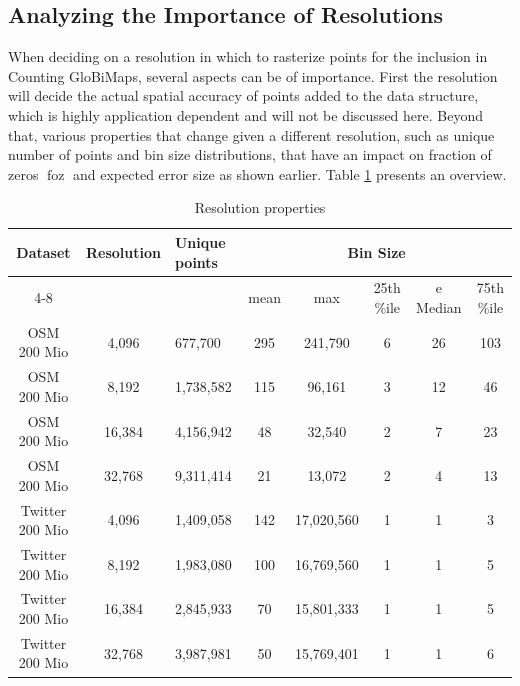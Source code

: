 \documentclass[sigconf, nonacm]{acmart}
\DeclareMathOperator{\foz}{foz}
\begin{document}
\subsection{Analyzing the Importance of Resolutions}
When deciding on a resolution in which to rasterize points for the inclusion in Counting GloBiMaps, several aspects can be of importance. First the resolution will decide the actual spatial accuracy of points added to the data structure, which is highly application dependent and will not be discussed here. Beyond that, various properties that change given a different resolution, such as unique number of points and bin size distributions, that have an impact on fraction of zeros $\foz$ and expected error size as shown earlier. Table \ref{table:Resolutions} presents an overview.

\begin{table}[b!]
  \centering
  \begin{tabular}{|c|c|l|c|c|c|c|c|}
    \hline
    \multirow{2}{*}{\bfseries Dataset}       &
    \multirow{2}{*}{\bfseries Resolution}    &
    \multirow{2}{*}{\bfseries Unique points} &
    \multicolumn{5}{|c|}{\bfseries Bin Size}                                                                               \\
    \cline{4-8}                              &        &           & mean & max        & 25th \%ile & e Median & 75th \%ile \\
    \hline
    OSM 200 Mio                              & 4,096  & 677,700   & 295  & 241,790    & 6          & 26       & 103        \\
    \hline
    OSM 200 Mio                              & 8,192  & 1,738,582 & 115  & 96,161     & 3          & 12       & 46         \\
    \hline
    OSM 200 Mio                              & 16,384 & 4,156,942 & 48   & 32,540     & 2          & 7        & 23         \\
    \hline
    OSM 200 Mio                              & 32,768 & 9,311,414 & 21   & 13,072     & 2          & 4        & 13         \\
    \hline
    Twitter 200 Mio                          & 4,096  & 1,409,058 & 142  & 17,020,560 & 1          & 1        & 3          \\
    \hline
    Twitter 200 Mio                          & 8,192  & 1,983,080 & 100  & 16,769,560 & 1          & 1        & 5          \\
    \hline
    Twitter 200 Mio                          & 16,384 & 2,845,933 & 70   & 15,801,333 & 1          & 1        & 5          \\
    \hline
    Twitter 200 Mio                          & 32,768 & 3,987,981 & 50   & 15,769,401 & 1          & 1        & 6          \\
    \hline
  \end{tabular}
  \caption{Resolution properties}
  \label{table:Resolutions}
\end{table}
\end{document}
